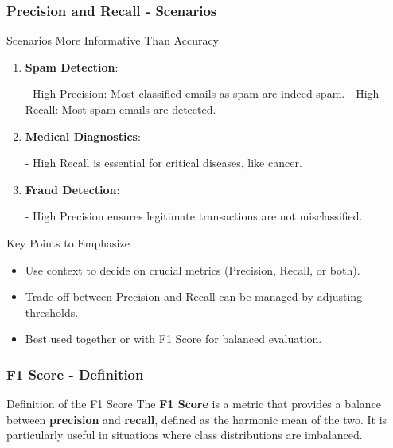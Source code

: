 \documentclass[aspectratio=169]{beamer}
\begin{document}
\begin{frame}[fragile]
    \frametitle{Precision and Recall - Scenarios}
    \begin{block}{Scenarios More Informative Than Accuracy}
        \begin{enumerate}
            \item \textbf{Spam Detection}:
                \begin{itemize}
                    - High Precision: Most classified emails as spam are indeed spam.
                    - High Recall: Most spam emails are detected.
                \end{itemize}
            \item \textbf{Medical Diagnostics}:
                \begin{itemize}
                    - High Recall is essential for critical diseases, like cancer.
                \end{itemize}
            \item \textbf{Fraud Detection}:
                \begin{itemize}
                    - High Precision ensures legitimate transactions are not misclassified.
                \end{itemize}
        \end{enumerate}
    \end{block}

    \begin{block}{Key Points to Emphasize}
        \begin{itemize}
            \item Use context to decide on crucial metrics (Precision, Recall, or both).
            \item Trade-off between Precision and Recall can be managed by adjusting thresholds.
            \item Best used together or with F1 Score for balanced evaluation.
        \end{itemize}
    \end{block}
\end{frame}

\begin{frame}[fragile]
    \frametitle{F1 Score - Definition}
    \begin{block}{Definition of the F1 Score}
        The \textbf{F1 Score} is a metric that provides a balance between \textbf{precision} and \textbf{recall}, defined as the harmonic mean of the two. 
        It is particularly useful in situations where class distributions are imbalanced.
    \end{block}
\end{frame}
\end{document}
